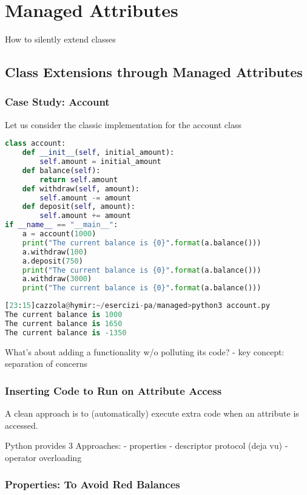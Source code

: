 \section{Managed Attributes}

How to silently extend classes

\subsection{Class Extensions through Managed Attributes}

\subsubsection{Case Study: Account}

Let us consider the classic implementation for the account class

\begin{lstlisting}[language=Python]
class account:
	def __init__(self, initial_amount):
		self.amount = initial_amount
	def balance(self):
		return self.amount
	def withdraw(self, amount):
		self.amount -= amount
	def deposit(self, amount):
		self.amount += amount
if __name__ == "__main__":
	a = account(1000)
	print("The current balance is {0}".format(a.balance()))
	a.withdraw(100)
	a.deposit(750)
	print("The current balance is {0}".format(a.balance()))
	a.withdraw(3000)
	print("The current balance is {0}".format(a.balance()))
\end{lstlisting}

\begin{lstlisting}[language=Python]
[23:15]cazzola@hymir:~/esercizi-pa/managed>python3 account.py
The current balance is 1000
The current balance is 1650
The current balance is -1350
\end{lstlisting}

What’s about adding a functionality w/o polluting its code?
- key concept: separation of concerns

\subsubsection{Inserting Code to Run on Attribute Access}
A clean approach is to (automatically) execute extra code when an attribute is accessed.

Python provides 3 Approaches:
- properties
- descriptor protocol (deja vu)
- operator overloading

\subsubsection{Properties: To Avoid Red Balances}

